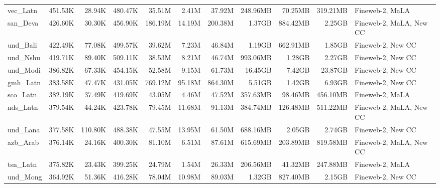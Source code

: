 \begin{table*}[!htp]
{\begin{tabular}{l|rrr|rrr|rrr|l}
vec\_Latn                   & 451.53K    & 28.94K       & 480.47K     & 35.51M       & 2.41M          & 37.92M        & 248.96MB   & 70.25MB      & 319.21MB    & Fineweb-2, MaLA         \\
san\_Deva                   & 426.60K    & 30.30K       & 456.90K     & 186.19M      & 14.19M         & 200.38M       & 1.37GB     & 884.42MB     & 2.25GB      & Fineweb-2, MaLA, New CC \\
und\_Bali                   & 422.49K    & 77.08K       & 499.57K     & 39.62M       & 7.23M          & 46.84M        & 1.19GB     & 662.91MB     & 1.85GB      & Fineweb-2, New CC       \\
und\_Nshu                   & 419.71K    & 89.40K       & 509.11K     & 38.53M       & 8.21M          & 46.74M        & 993.06MB   & 1.28GB       & 2.27GB      & Fineweb-2, New CC       \\
und\_Modi                   & 386.82K    & 67.33K       & 454.15K     & 52.58M       & 9.15M          & 61.73M        & 16.45GB    & 7.42GB       & 23.87GB     & Fineweb-2, New CC       \\
gmh\_Latn                   & 383.58K    & 47.47K       & 431.05K     & 769.12M      & 95.18M         & 864.30M       & 5.51GB     & 1.42GB       & 6.93GB      & Fineweb-2, New CC       \\
sco\_Latn                   & 382.19K    & 37.49K       & 419.69K     & 43.05M       & 4.46M          & 47.52M        & 357.63MB   & 98.46MB      & 456.10MB    & Fineweb-2, MaLA         \\
nds\_Latn                   & 379.54K    & 44.24K       & 423.78K     & 79.45M       & 11.68M         & 91.13M        & 384.74MB   & 126.48MB     & 511.22MB    & Fineweb-2, MaLA, New CC \\
und\_Lana                   & 377.58K    & 110.80K      & 488.38K     & 47.55M       & 13.95M         & 61.50M        & 688.16MB   & 2.05GB       & 2.74GB      & Fineweb-2, New CC       \\
azb\_Arab                   & 376.14K    & 24.16K       & 400.30K     & 81.10M       & 6.51M          & 87.61M        & 615.69MB   & 203.89MB     & 819.58MB    & Fineweb-2, MaLA, New CC \\
tsn\_Latn                   & 375.82K    & 23.43K       & 399.25K     & 24.79M       & 1.54M          & 26.33M        & 206.56MB   & 41.32MB      & 247.88MB    & Fineweb-2, MaLA         \\
und\_Mong                   & 364.92K    & 51.36K       & 416.28K     & 78.04M       & 10.98M         & 89.03M        & 1.32GB     & 827.40MB     & 2.15GB      & Fineweb-2, New CC       \\

\end{tabular}}
\end{table*}
